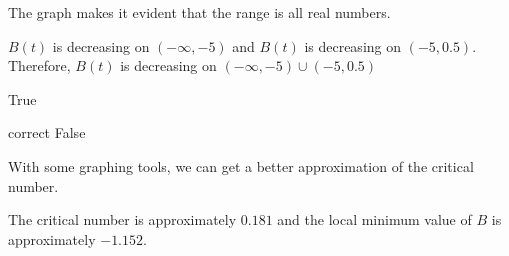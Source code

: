 \documentclass{ximera}
\begin{document}
\begin{example}
\begin{explanation}
The graph makes it evident that the range is all real numbers.






\begin{question}

$B(t)$ is decreasing on $(-\infty, -5)$ and $B(t)$ is decreasing on $(-5, 0.5)$.  Therefore, $B(t)$ is decreasing on $(-\infty, -5) \cup (-5, 0.5)$


\begin{multipleChoice}
\item {True}
\item[correct] {False}
\end{multipleChoice}
\end{question}

\end{explanation}

\end{example}








With some graphing tools, we can get a better approximation of the critical number.




\begin{center}
\end{center}



The critical number is approximately $0.181$ and the local minimum value of $B$ is approximately $-1.152$.
\end{document}
